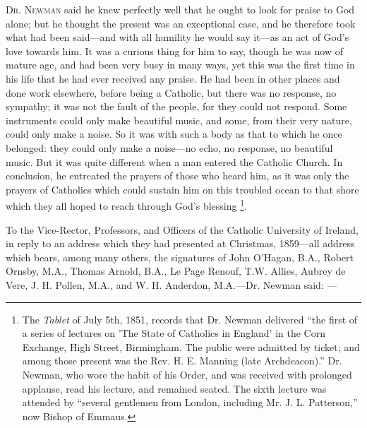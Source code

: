 D\textsc{r}. N\textsc{ewman}
said he knew perfectly well that he ought to look for praise to God
alone; but he thought the present was an exceptional case, and he
therefore took what had been said—and with all humility he would say
it—as an act of God's love towards him. It was a curious thing for
him to say, though he was now of mature age, and had been very busy in
many ways, yet this was the first time in his life that he had ever
received any praise. He had been in other places and done work
elsewhere, before being a Catholic, but there was no response, no
sympathy; it was not the fault of the people, for they could not
respond. Some instruments could only make beautiful music, and some,
from their very nature, could only make a noise. So it was with such a
body as that to which he once belonged: they could only make a
noise—no echo, no response, no beautiful music. But it was quite
different when a man entered the Catholic Church. In conclusion, he
entreated the prayers of those who heard him, as it was only the
prayers of Catholics which could sustain him on this troubled ocean to
that shore which they all hoped to reach through God's blessing \footnote{The \emph{Tablet} of July 5th, 1851, records that
Dr. Newman delivered ``the first of a series of lectures on 'The State
of Catholics in England' in the Corn Exchange, High Street,
Birmingham. The public were admitted by ticket; and among those
present was the Rev. H. E. Manning (late Archdeacon).'' Dr. Newman, who
wore the habit of his Order, and was received with prolonged applause,
read his lecture, and remained seated. The sixth lecture was attended
by ``several gentlemen from London, including Mr. J. L. Patterson,'' now
Bishop of Emmaus.}.


To the Vice-Rector, Professors, and Officers of
the Catholic University of Ireland, in reply to an address which they
had presented at Christmas, 1859—all address which bears, among many
others, the signatures of John O'Hagan, B.A., Robert Ornsby, M.A.,
Thomas Arnold, B.A., Le Page Renouf, T.W. Allies, Aubrey de Vere, J.
H. Pollen, M.A., and W. H. Anderdon, M.A.—Dr. Newman said: —

